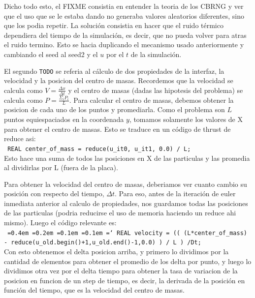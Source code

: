 Dicho todo esto, el FIXME consistia en entender la teoria de los CBRNG y ver que el uso que se le estaba dando
no generaba valores aleatorios diferentes, sino que los podia repetir. La soluci\'on consistia en hacer que el ruido
t\'ermico dependiera del tiempo de la simulaci\'on, es decir, que no pueda volver para atras el ruido termino.
Esto se hacia duplicando el mecanismo usado anteriormente y cambiando el seed al seed2 y el $u$ por el $t$ de la simulaci\'on.


El segundo \texttt{TODO} se referia al c\'alculo de dos propiedades de la interfaz, la velocidad y la posicion del centro de masas.
Recordemos que la velocidad se calcula como $V = \frac{\Delta x}{\Delta t}$ y el centro de masas (dadas las hipotesis del problema)
se calcula como $P = \frac{\Sigma_i P_i}{L}$. Para calcular el centro de masas, debemos obtener la posicion de cada uno de los
puntos y promediarla. Como el problema son $L$ puntos equiespaciados en la coordenada $y$, tomamos solamente los valores 
de X para obtener el centro de masas. Esto se traduce en un c\'odigo de thrust de reduce asi: \\
\texttt{ REAL center\_of\_mass = reduce(u\_it0, u\_it1, 0.0) / L;}\\
Esto hace una suma de todos las posiciones en X de las particulas y las promedia al dividirlas por L (fuera de la placa).

Para obtener la velocidad del centro de masas, deberiamos ver cuanto cambio su posici\'on con respecto del tiempo, $\Delta t$.
Para eso, antes de la iteraci\'on de euler inmediata anterior al calculo de propiedades, nos guardamos todas las posiciones
de las particulas (podria reducirse el uso de memoria haciendo un reduce ahi mismo).
Luego el c\'odigo relevante es:\\
\newcommand*\justify{%
  \fontdimen2\font=0.4em%
  \fontdimen3\font=0.2em%
  \fontdimen4\font=0.1em%
  \fontdimen7\font=0.1em%
  \hyphenchar\font=`\-%
}
\texttt{\justify{REAL velocity =  (( (L*center\_of\_mass) - reduce(u\_old.begin()+1,u\_old.end()-1,0.0) 
                                 ) / L  
                                 ) /Dt;  
                             }}\\
Con esto obtenemos el delta posicion arriba, y primero lo dividimos por la cantidad de elementos para obtener el promedio de los
delta por punto, y luego lo dividimos otra vez por el delta tiempo para obtener la tasa de variacion de la posicion en funcion
de un step de tiempo, es decir, la derivada de la posici\'on en funci\'on del tiempo, que es la velocidad del centro de masas.


